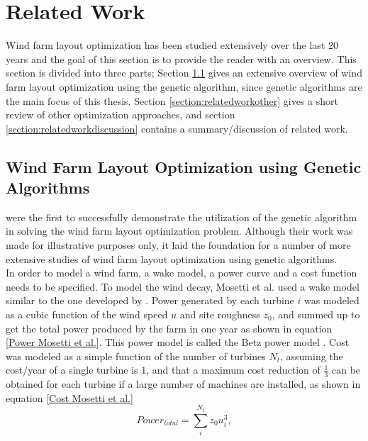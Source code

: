 \chapter{Related Work}\label{chapter:relatedwork}
Wind farm layout optimization has been studied extensively over the last 20 years and the goal of this section is to provide the reader with an overview. This section is divided into three parts; Section \ref{section:relatedworkga} gives an extensive overview of wind farm layout optimization using the genetic algorithm, since genetic algorithms are the main focus of this thesis. Section \ref{section:relatedworkother} gives a short review of other optimization approaches, and section \ref{section:relatedworkdiscussion} contains a summary/discussion of related work.


\section{Wind Farm Layout Optimization using Genetic Algorithms}\label{section:relatedworkga}


\cite{Mosetti} were the first to successfully demonstrate the utilization of the genetic algorithm in solving the wind farm layout optimization problem. Although their work was made for illustrative purposes only, it laid the foundation for a number of more extensive studies of wind farm layout optimization using genetic algorithms.\\

\noindent In order to model a wind farm, a wake model, a power curve and a cost function needs to be specified. To model the wind decay, Mosetti et al. used a wake model similar to the one developed by \cite{Jensen}. Power generated by each turbine $i$ was modeled as a cubic function of the wind speed $u$ and site roughness $z_0$, and summed up to get the total power produced by the farm in one year as shown in equation \ref{Power Mosetti et al.}. This power model is called the Betz power model \citep{Albring}. Cost was modeled as a simple function of the number of turbines $N_t$, assuming the cost/year of a single turbine is $1$, and that a maximum cost reduction of $\frac{1}{3}$ can be obtained for each turbine if a large number of machines are installed, as shown in equation \ref{Cost Mosetti et al.} \\


\begin{equation}
\label{Power Mosetti et al.}
Power_{total} = \sum^{N_t}_{i} z_0u_i^3,
\end{equation}



